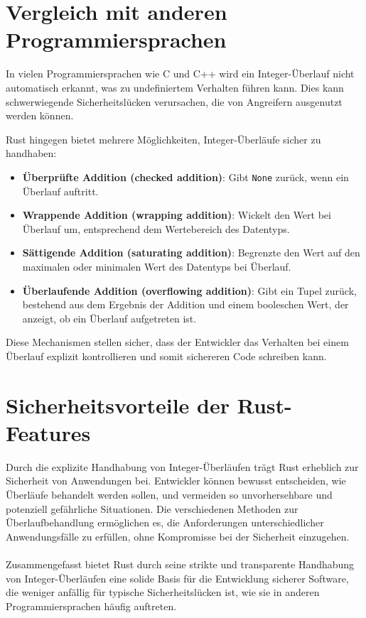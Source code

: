 \section{Vergleich mit anderen Programmiersprachen}

In vielen Programmiersprachen wie C und C++ wird ein Integer-Überlauf nicht automatisch erkannt, was zu undefiniertem Verhalten führen kann. 
Dies kann schwerwiegende Sicherheitslücken verursachen, die von Angreifern ausgenutzt werden können.

Rust hingegen bietet mehrere Möglichkeiten, Integer-Überläufe sicher zu handhaben:

\begin{itemize}
    \item \textbf{Überprüfte Addition (checked addition)}: Gibt \texttt{None} zurück, wenn ein Überlauf auftritt.
    \item \textbf{Wrappende Addition (wrapping addition)}: Wickelt den Wert bei Überlauf um, entsprechend dem Wertebereich des Datentyps.
    \item \textbf{Sättigende Addition (saturating addition)}: Begrenzte den Wert auf den maximalen oder minimalen Wert des Datentyps bei Überlauf.
    \item \textbf{Überlaufende Addition (overflowing addition)}: Gibt ein Tupel zurück, bestehend aus dem Ergebnis der Addition und einem booleschen Wert, der anzeigt, ob ein Überlauf aufgetreten ist.
\end{itemize}
\noindent
Diese Mechanismen stellen sicher, dass der Entwickler das Verhalten bei einem Überlauf explizit kontrollieren und somit sichereren Code schreiben kann.

\section{Sicherheitsvorteile der Rust-Features}

Durch die explizite Handhabung von Integer-Überläufen trägt Rust erheblich zur Sicherheit von Anwendungen bei. 
Entwickler können bewusst entscheiden, wie Überläufe behandelt werden sollen, und vermeiden so unvorhersehbare und potenziell gefährliche Situationen. 
Die verschiedenen Methoden zur Überlaufbehandlung ermöglichen es, die Anforderungen unterschiedlicher Anwendungsfälle zu erfüllen, ohne Kompromisse bei der Sicherheit einzugehen.\\
\\
Zusammengefasst bietet Rust durch seine strikte und transparente Handhabung von Integer-Überläufen eine solide Basis für die Entwicklung sicherer Software, die weniger anfällig für typische Sicherheitslücken ist, wie sie in anderen Programmiersprachen häufig auftreten.

